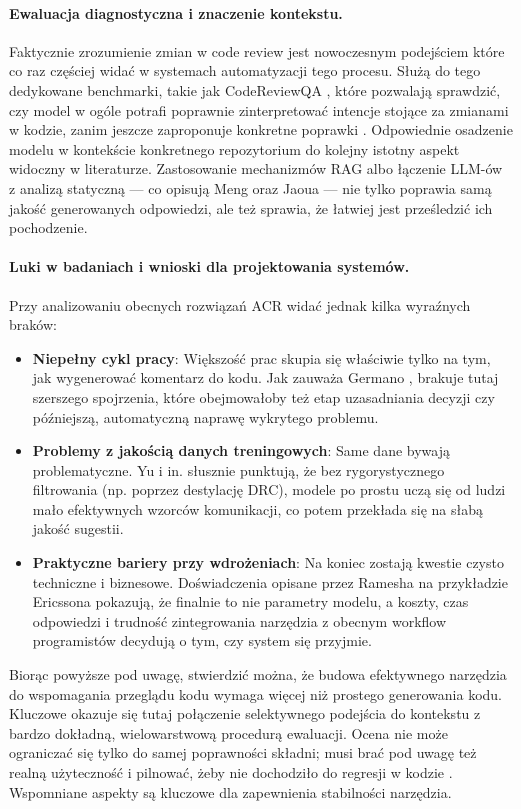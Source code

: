 \paragraph{Ewaluacja diagnostyczna i znaczenie kontekstu.}
Faktycznie zrozumienie zmian w code review jest nowoczesnym podejściem które co raz częściej widać w systemach automatyzacji
tego procesu. Służą do tego dedykowane benchmarki, takie jak CodeReviewQA 
\cite{Lin2025CodeReviewQA}, które pozwalają sprawdzić, czy model w ogóle potrafi poprawnie zinterpretować intencje stojące za 
zmianami w kodzie, zanim jeszcze zaproponuje konkretne poprawki \cite{Lin2025CodeReviewQA}. Odpowiednie osadzenie modelu
w kontekście konkretnego repozytorium do kolejny istotny aspekt widoczny w literaturze. Zastosowanie mechanizmów RAG albo
łączenie LLM-ów z analizą statyczną — co opisują Meng \cite{Meng2025RARe} oraz Jaoua \cite{Jaoua2025LLMStaticAnalyzersCR} — nie tylko
poprawia samą jakość generowanych odpowiedzi, ale też sprawia, że łatwiej jest prześledzić ich pochodzenie.

\paragraph{Luki w badaniach i wnioski dla projektowania systemów.}
Przy analizowaniu obecnych rozwiązań ACR widać jednak kilka wyraźnych braków:
\begin{itemize}
    \item \textbf{Niepełny cykl pracy}: Większość prac skupia się właściwie tylko na tym, 
jak wygenerować komentarz do kodu. Jak zauważa Germano \cite{Germano2025VulnSLR}, brakuje tutaj szerszego spojrzenia, które 
obejmowałoby też etap uzasadniania decyzji czy późniejszą, automatyczną naprawę wykrytego problemu.
    \item \textbf{Problemy z jakością danych treningowych}: Same dane bywają problematyczne. Yu i 
in. \cite{Yu2025Desiview} słusznie punktują, że bez rygorystycznego filtrowania (np. poprzez destylację DRC), modele po 
prostu uczą się od ludzi mało efektywnych wzorców komunikacji, co potem przekłada się na 
słabą jakość sugestii.
    \item \textbf{Praktyczne bariery przy wdrożeniach}: Na koniec zostają kwestie czysto techniczne i 
biznesowe. Doświadczenia opisane przez Ramesha na przykładzie Ericssona \cite{Ramesh2025EricssonExperience} pokazują, że finalnie to nie 
parametry modelu, a koszty, czas odpowiedzi i trudność zintegrowania narzędzia z obecnym workflow programistów 
decydują o tym, czy system się przyjmie.
\end{itemize}

Biorąc powyższe pod uwagę, stwierdzić można, że budowa efektywnego narzędzia do wspomagania przeglądu kodu
wymaga więcej niż prostego generowania kodu. Kluczowe okazuje się tutaj 
połączenie selektywnego podejścia do kontekstu z bardzo dokładną, wielowarstwową 
procedurą ewaluacji. Ocena nie może ograniczać się tylko do samej poprawności składni; 
musi brać pod uwagę też realną użyteczność i pilnować, żeby nie dochodziło 
do regresji w kodzie \cite{Tufano2024CodeReviewAutomation, Zhang2024SurveyLLMSE}. 
Wspomniane aspekty są kluczowe dla zapewnienia stabilności narzędzia.